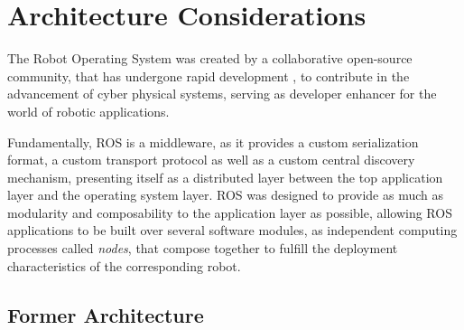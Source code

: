\section{Architecture Considerations}

The Robot Operating System was created by a collaborative open-source community, that has undergone rapid development \cite{cousins2011exponential}, to contribute in the advancement of cyber physical systems, serving as developer enhancer for the world of robotic applications. \cite{diluoffo2018robot, intro-ros}


Fundamentally, ROS is a middleware, as it provides a custom serialization format, a custom transport protocol as well as a custom central discovery mechanism, presenting itself as a distributed layer between the top application layer and the operating system layer. ROS was designed to provide as much as modularity and composability to the application layer \cite{casini2019response} as possible, allowing ROS applications to be built over several software modules, as independent computing processes called \textit{nodes}, that compose together to fulfill the deployment characteristics of the corresponding robot. \cite{maruyama2016exploring} 

\subsection{Former Architecture}



